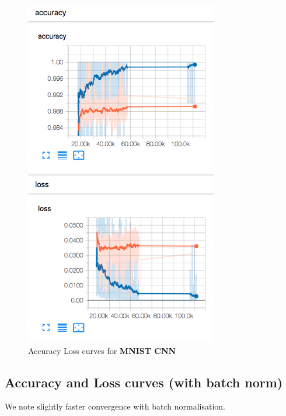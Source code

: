 \begin{figure}[ht]
\centering
\includegraphics[angle=0,width=0.75\textwidth]{assign-2/logs/train/TensorBoard.png}
\caption{Accuracy Loss curves for \textbf{MNIST CNN}}
\end{figure}

\subsection{Accuracy and Loss curves (with batch norm)}

We note slightly faster convergence with batch normalisation.

